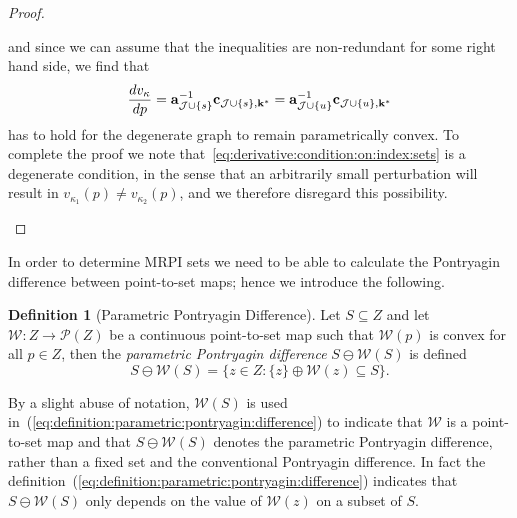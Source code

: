 \documentclass[journal]{IEEEtran}
\newcommand{\todo}[2]{%
  \providetoggle{#1}%
    \iftoggle{#1}{%
    {\color{red}#2}%
    }{#2}%
}
\newcounter{thmcount}
\theoremstyle{remark}
\newtheorem{rem}[thmcount]{Remark}
\theoremstyle{definition}
\newtheorem{defi}[thmcount]{Definition}
\begin{document}
\begin{proof}
\begin{enumerate}
%
and since we can assume that the inequalities are non-redundant for some right hand side, we find that 
%
\begin{equation}\label{eq:derivative:condition:on:index:sets}
  \frac{dv_\kappa}{dp} = {\bf{a}}_{\mathcal J\cup \{s\}}^{-1}{\bf{c}}_{\mathcal J\cup \{s\},{\bf{k}}^\ast} = 
  {\bf{a}}_{\mathcal J\cup \{u\}}^{-1}{\bf{c}}_{\mathcal J\cup \{u\},{\bf{k}}^\ast}
\end{equation}
%
has to hold for the degenerate graph to remain parametrically convex.
%
To complete the proof we note that~\eqref{eq:derivative:condition:on:index:sets} is a degenerate condition, in the sense that an arbitrarily small perturbation will result in $v_{\kappa_1}(p) \neq v_{\kappa_2}(p)$, and we therefore disregard this possibility.
\end{enumerate}
\baselineskip
\end{proof}
%
%
In order to determine MRPI sets we need to be able to calculate the Pontryagin difference between point-to-set maps; hence we introduce the following.
%
\begin{defi}[Parametric Pontryagin Difference]\label{def:parametric:pontryagin:difference}
  Let $S\subseteq Z$ and let $\mathcal W:Z\to\mathscr P(Z)$ be a continuous point-to-set map such that
  $\mathcal W(p)$ is convex for all $p\in Z$, then the \emph{parametric Pontryagin difference} 
  $S\ominus \mathcal W(S)$ is defined
%
\begin{equation}\label{eq:definition:parametric:pontryagin:difference}
    S\ominus \mathcal W(S) = \bigl\{z\in Z: \{z\} \oplus \mathcal W(z)\subseteq S\bigr\}.
  \end{equation}
%
\end{defi}
%
By a slight abuse of notation, $\mathcal{W}(S)$ is used in~(\ref{eq:definition:parametric:pontryagin:difference}) to indicate that $\mathcal{W}$ is a point-to-set map and that $S\ominus\mathcal{W}(S)$ denotes the parametric Pontryagin difference, rather than a fixed set and the conventional Pontryagin difference. In fact the definition~(\ref{eq:definition:parametric:pontryagin:difference}) indicates that $S\ominus \mathcal{W}(S)$ only depends on the value of $\mathcal{W}(z)$ on a subset of $S$. 
%
\end{document}
